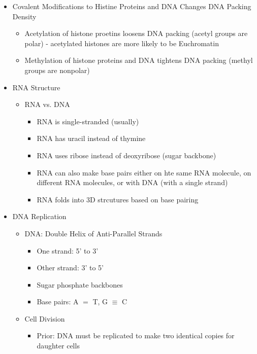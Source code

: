 \documentclass[12pt]{article}
\begin{document}
\begin{itemize}
\begin{itemize}
        \end{itemize}
        \item Covalent Modifications to Histine Proteins and DNA Changes DNA Packing Density
        \begin{itemize}
            \item Acetylation of histone proetins loosens DNA packing (acetyl groups are polar) - acetylated histones are more likely to be Euchromatin
            \item Methylation of histone proteins and DNA tightens DNA packing (methyl groups are nonpolar)
        \end{itemize}
        \item RNA Structure
        \begin{itemize}
            \item RNA vs. DNA
            \begin{itemize}
                \item RNA is single-stranded (usually)
                \item RNA has uracil instead of thymine
                \item RNA uses ribose instead of deoxyribose (sugar backbone)
                \item RNA can also make base pairs either on hte same RNA molecule, on different RNA molecules, or with DNA (with a single strand)
                \item RNA folds into 3D strcutures based on base pairing
            \end{itemize}
        \end{itemize}
        \item DNA Replication
        \begin{itemize}
            \item DNA: Double Helix of Anti-Parallel Strands
            \begin{itemize}
                \item One strand: 5' to 3'
                \item Other strand: 3' to 5'
                \item Sugar phosphate backbones
                \item Base pairs: A $=$ T, G $\equiv$ C
            \end{itemize}
            \item Cell Division
            \begin{itemize}
                \item Prior: DNA must be replicated to make two identical copies for daughter cells

\end{itemize}
\end{itemize}
\end{itemize}
\end{document}
